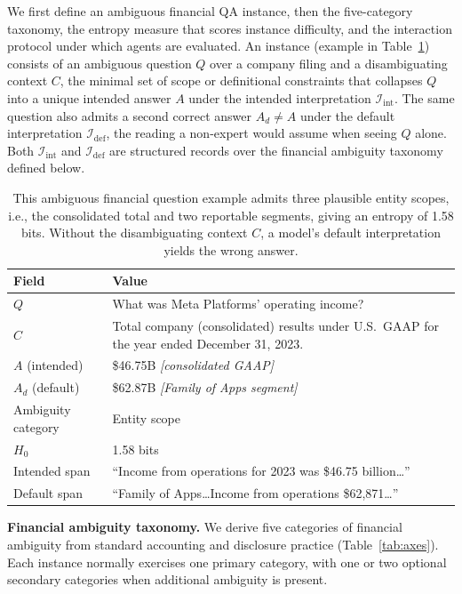 We first define an ambiguous financial QA instance, then the five-category taxonomy, the entropy measure that scores instance difficulty, and the interaction protocol under which agents are evaluated. An instance (example in Table~\ref{tab:example}) consists of an ambiguous question $Q$ over a company filing and a disambiguating context $C$, the minimal set of scope or definitional constraints that collapses $Q$ into a unique intended answer $A$ under the intended interpretation $\mathcal{I}_{\text{int}}$. The same question also admits a second correct answer $A_{d}\neq A$ under the default interpretation $\mathcal{I}_{\text{def}}$, the reading a non-expert would assume when seeing $Q$ alone. Both $\mathcal{I}_{\text{int}}$ and $\mathcal{I}_{\text{def}}$ are structured records over the financial ambiguity taxonomy defined below.
\begin{table}[t]
\centering

\small
\begin{tabular}{p{}p{}}
\toprule
Field & Value \\
\midrule
$Q$ &
  What was Meta Platforms' operating income? \\
$C$ &
  Total company (consolidated) results under U.S.\ GAAP for the year
  ended December 31, 2023. \\
$A$ (intended) &
  \$46.75B \emph{[consolidated GAAP]} \\
$A_d$ (default) &
  \$62.87B \emph{[Family of Apps segment]} \\
\midrule
Ambiguity category & Entity scope \\
$H_0$ & 1.58 bits \\
\midrule
Intended span &
  ``Income from operations for 2023 was \$46.75 billion\ldots'' \\
Default span &
  ``Family of Apps\ldots Income from operations \$62,871\ldots'' \\
\bottomrule
\end{tabular}
\caption{This ambiguous financial question example admits three plausible entity scopes, i.e., the consolidated total and two reportable segments, giving an entropy of 1.58 bits. Without the disambiguating context $C$, a model's default interpretation yields the wrong answer.}
\label{tab:example}
\end{table}

\textbf{Financial ambiguity taxonomy.}
We derive five categories of financial ambiguity from standard
accounting and disclosure practice (Table~\ref{tab:axes}). Each instance normally exercises one primary category, with one or two optional secondary categories when additional ambiguity is present.

